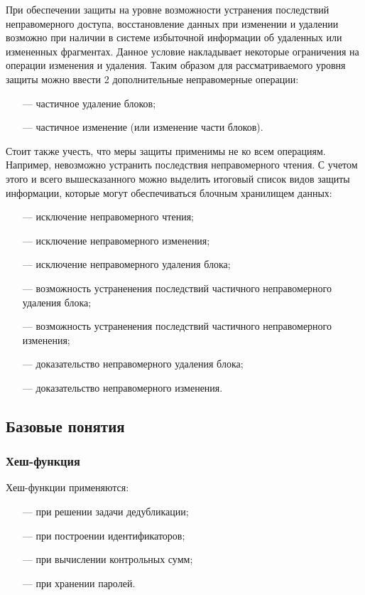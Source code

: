 При обеспечении защиты на уровне возможности устранения последствий неправомерного доступа, восстановление данных при изменении и удалении возможно при наличии в системе избыточной информации об удаленных или измененных фрагментах. Данное условие накладывает некоторые ограничения на операции изменения и удаления. Таким образом для рассматриваемого уровня защиты можно ввести 2 дополнительные неправомерные операции:

\begin{enumerate}
	\item [---] частичное удаление блоков;
    \item [---] частичное изменение (или изменение части блоков).
\end{enumerate}

Стоит также учесть, что меры защиты применимы не ко всем операциям. Например, невозможно устранить последствия неправомерного чтения. С учетом этого и всего вышесказанного можно выделить итоговый список видов защиты информации, которые могут обеспечиваться блочным хранилищем данных:
\begin{itemize}
	\item [---] исключение неправомерного чтения;
	\item [---] исключение неправомерного изменения;
	\item [---] исключение неправомерного удаления блока;
	\item [---] возможность устраненения последствий частичного неправомерного удаления блока;
	\item [---] возможность устраненения последствий частичного неправомерного изменения;
	\item [---] доказательство неправомерного удаления блока;
	\item [---] доказательство неправомерного изменения.
\end{itemize}


\subsection{Базовые понятия}

\subsubsection{Хеш-функция}

Хеш-функции применяются:
\begin{itemize}
	\item[---] при решении задачи дедубликации;
	\item[---] при построении идентификаторов;
	\item[---] при вычислении контрольных сумм;
	\item[---] при хранении паролей.
\end{itemize}

